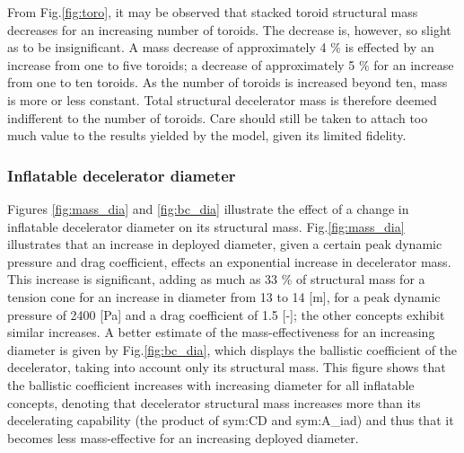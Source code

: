From Fig.\ref{fig:toro}, it may be observed that stacked toroid structural mass decreases for an increasing number of toroids. The decrease is, however, so slight as to be insignificant. A mass decrease of approximately 4 $\%$ is effected by an increase from one to five toroids; a decrease of approximately 5 $\%$ for an increase from one to ten toroids. As the number of toroids is increased beyond ten, mass is more or less constant. Total structural decelerator mass is therefore deemed indifferent to the number of toroids. Care should still be taken to attach too much value to the results yielded by the model, given its limited fidelity.

\subsubsection{Inflatable decelerator diameter}
Figures \ref{fig:mass_dia} and \ref{fig:bc_dia} illustrate the effect of a change in inflatable decelerator diameter on its structural mass. Fig.\ref{fig:mass_dia} illustrates that an increase in deployed diameter, given a certain peak dynamic pressure and drag coefficient, effects an exponential increase in decelerator mass. This increase is significant, adding as much as 33 $\%$ of structural mass for a tension cone for an increase in diameter from 13 to 14 [m], for a peak dynamic pressure of 2400 [Pa] and a drag coefficient of 1.5 [-]; the other concepts exhibit similar increases. A better estimate of the mass-effectiveness for an increasing diameter is given by Fig.\ref{fig:bc_dia}, which displays the ballistic coefficient of the decelerator, taking into account only its structural mass. This figure shows that the ballistic coefficient increases with increasing diameter for all inflatable concepts, denoting that decelerator structural mass increases more than its decelerating capability (the product of \gls{sym:CD} and \gls{sym:A_iad}) and thus that it becomes less mass-effective for an increasing deployed diameter.


